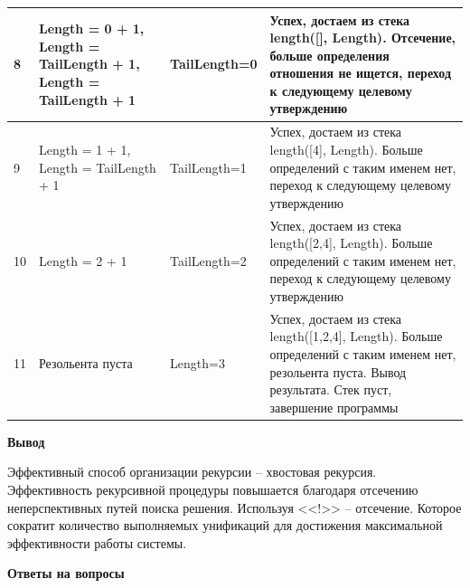 \documentclass[a4paper,14pt]{extreport} %
\begin{document}
\begin{longtable}{|p{0.5cm}|p{5cm}|p{6cm}|p{5.5cm}|}
	8 & Length = 0 + 1, Length = TailLength + 1, Length = TailLength + 1 & TailLength=0 & Успех, достаем из стека length([], Length).  Отсечение, больше определения отношения не ищется, переход к следующему целевому утверждению \\ \hline
	
	9 & Length = 1 + 1, Length = TailLength + 1 & TailLength=1 & Успех, достаем из стека length([4], Length). Больше определений с таким именем нет, переход к следующему целевому утверждению \\ \hline
	
	10 & Length = 2 + 1 & TailLength=2 & Успех, достаем из стека length([2,4], Length). Больше определений с таким именем нет, переход к следующему целевому утверждению \\ \hline
	
	11 & Резольента пуста & Length=3 & Успех, достаем из стека length([1,2,4], Length). Больше определений с таким именем нет, резольента пуста. Вывод результата. Стек пуст, завершение программы \\ \hline
	
\end{longtable}

\hfill

\textbf{Вывод}

Эффективный способ организации рекурсии --  хвостовая рекурсия. Эффективность рекурсивной процедуры повышается благодаря отсечению неперспективных путей поиска решения. Используя <<!>> -- отсечение. Которое сократит количество выполняемых унификаций для достижения максимальной эффективности работы системы. 

\textbf{Ответы на вопросы}
\end{document}
